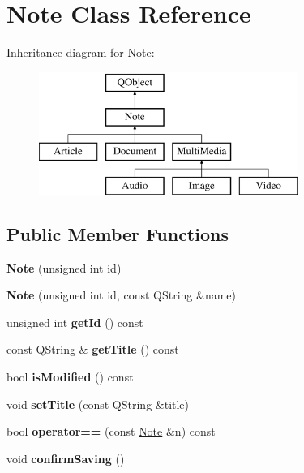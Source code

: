\hypertarget{class_note}{\section{Note Class Reference}
\label{class_note}
}
Inheritance diagram for Note\-:\begin{figure}[H]
\begin{center}
\leavevmode
\includegraphics[height=4.000000cm]{class_note}
\end{center}
\end{figure}
\subsection*{Public Member Functions}
\begin{DoxyCompactItemize}
\item 
\hypertarget{class_note_a16e83a8d0c36fb7b9fb7e43fb727f182}{{\bfseries Note} (unsigned int id)}\label{class_note_a16e83a8d0c36fb7b9fb7e43fb727f182}

\item 
\hypertarget{class_note_ad243e14af0d11d2a659b8c797da2f279}{{\bfseries Note} (unsigned int id, const Q\-String \&name)}\label{class_note_ad243e14af0d11d2a659b8c797da2f279}

\item 
\hypertarget{class_note_ac4dec7ff573051d2bdf4ff6d6a149536}{unsigned int {\bfseries get\-Id} () const }\label{class_note_ac4dec7ff573051d2bdf4ff6d6a149536}

\item 
\hypertarget{class_note_ac5891af072f8e8d990909a65c0702244}{const Q\-String \& {\bfseries get\-Title} () const }\label{class_note_ac5891af072f8e8d990909a65c0702244}

\item 
\hypertarget{class_note_abe3ea587b0371292768ce5b6cccfc796}{bool {\bfseries is\-Modified} () const }\label{class_note_abe3ea587b0371292768ce5b6cccfc796}

\item 
\hypertarget{class_note_a65150ecf35f28f67a601f687ea3971c8}{void {\bfseries set\-Title} (const Q\-String \&title)}\label{class_note_a65150ecf35f28f67a601f687ea3971c8}

\item 
\hypertarget{class_note_a35d63d0855b6f83d0182962a664643e6}{bool {\bfseries operator==} (const \hyperlink{class_note}{Note} \&n) const }\label{class_note_a35d63d0855b6f83d0182962a664643e6}

\item 
\hypertarget{class_note_a52b0c198d3ce6e6bdb370d76654139d6}{void {\bfseries confirm\-Saving} ()}\label{class_note_a52b0c198d3ce6e6bdb370d76654139d6}

\end{DoxyCompactItemize}

